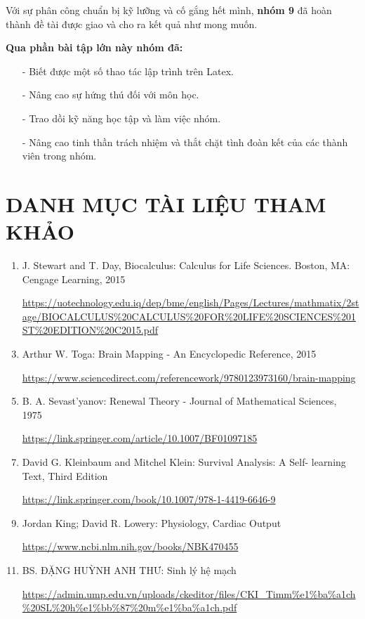 \documentclass[12pt,a4paper]{article}
\begin{document}
\vspace{2em}
Với sự phân công chuẩn bị kỹ lưỡng và cố gắng hết mình, \textbf{nhóm 9} đã hoàn thành đề tài được giao và cho ra kết quả như mong muốn.

\vspace{2em}
\textbf{Qua phần bài tập lớn này nhóm đã:}
\begin{itemize}
	\item[-] Biết được một số thao tác lập trình trên Latex.
	\item[-] Nâng cao sự hứng thú đối với môn học.
	\item[-] Trao dồi kỹ năng học tập và làm việc nhóm.
	\item[-] Nâng cao tinh thần trách nhiệm và thắt chặt tình đoàn kết của các thành viên trong nhóm.
\end{itemize}

\newpage
{}
\section*{\small\textbf{DANH MỤC TÀI LIỆU THAM KHẢO}}
\begin{small}
	\begin{enumerate}
		\item J. Stewart and T. Day, Biocalculus: Calculus for Life Sciences. Boston, MA: Cengage Learning, 2015
		\item[] \textcolor{cyan}{\url{https://uotechnology.edu.iq/dep/bme/english/Pages/Lectures/mathmatix/2stage/BIOCALCULUS\%20CALCULUS\%20FOR\%20LIFE\%20SCIENCES\%201ST\%20EDITION\%20C2015.pdf}}
		\item Arthur W. Toga: Brain Mapping - An Encyclopedic Reference, 2015
		\item[] \textcolor{cyan}{\url{https://www.sciencedirect.com/referencework/9780123973160/brain-mapping}}
		\item B. A. Sevast'yanov: Renewal Theory - Journal of Mathematical Sciences, 1975
		\item[] \textcolor{cyan}{\url{https://link.springer.com/article/10.1007/BF01097185}}
		\item David G. Kleinbaum and Mitchel Klein: Survival Analysis: A Self- learning Text, Third Edition
		\item[] \textcolor{cyan}{\url{https://link.springer.com/book/10.1007/978-1-4419-6646-9}}
		\item Jordan King; David R. Lowery: Physiology, Cardiac Output
		\item[] \textcolor{cyan}{\url{https://www.ncbi.nlm.nih.gov/books/NBK470455}}
		\item BS. ĐẶNG HUỲNH ANH THƯ: Sinh lý hệ mạch
		\item[] \textcolor{cyan}{\url{https://admin.ump.edu.vn/uploads/ckeditor/files/CKI\_Timm\%e1\%ba\%a1ch\%20SL\%20h\%e1\%bb\%87\%20m\%e1\%ba\%a1ch.pdf}}

	\end{enumerate}
\end{small}
\end{document}
